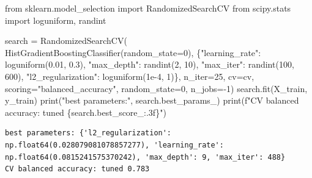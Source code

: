 \documentclass[
  letterpaper,
  DIV=11,
  numbers=noendperiod]{scrreprt}
\newenvironment{Shaded}{\begin{snugshade}}{\end{snugshade}}
\newcommand{\BuiltInTok}[1]{\textcolor[rgb]{0.00,0.23,0.31}{#1}}
\newcommand{\DecValTok}[1]{\textcolor[rgb]{0.68,0.00,0.00}{#1}}
\newcommand{\FloatTok}[1]{\textcolor[rgb]{0.68,0.00,0.00}{#1}}
\newcommand{\ImportTok}[1]{\textcolor[rgb]{0.00,0.46,0.62}{#1}}
\newcommand{\NormalTok}[1]{\textcolor[rgb]{0.00,0.23,0.31}{#1}}
\newcommand{\OperatorTok}[1]{\textcolor[rgb]{0.37,0.37,0.37}{#1}}
\newcommand{\SpecialCharTok}[1]{\textcolor[rgb]{0.37,0.37,0.37}{#1}}
\newcommand{\SpecialStringTok}[1]{\textcolor[rgb]{0.13,0.47,0.30}{#1}}
\newcommand{\StringTok}[1]{\textcolor[rgb]{0.13,0.47,0.30}{#1}}
\begin{document}
\begin{tcolorbox}[enhanced jigsaw, left=2mm, title=\textcolor{quarto-callout-caution-color}{\faFire}\hspace{0.5em}{Solution to Exercise 1}, opacityback=0, breakable, rightrule=.15mm, arc=.35mm, toptitle=1mm, colbacktitle=quarto-callout-caution-color!10!white, opacitybacktitle=0.6, coltitle=black, colframe=quarto-callout-caution-color-frame, bottomrule=.15mm, leftrule=.75mm, bottomtitle=1mm, titlerule=0mm, toprule=.15mm, colback=white]

\begin{Shaded}
\begin{Highlighting}[]
\ImportTok{from}\NormalTok{ sklearn.model\_selection }\ImportTok{import}\NormalTok{ RandomizedSearchCV}
\ImportTok{from}\NormalTok{ scipy.stats }\ImportTok{import}\NormalTok{ loguniform, randint}

\NormalTok{search }\OperatorTok{=}\NormalTok{ RandomizedSearchCV(}
\NormalTok{    HistGradientBoostingClassifier(random\_state}\OperatorTok{=}\DecValTok{0}\NormalTok{),}
\NormalTok{    \{}\StringTok{"learning\_rate"}\NormalTok{: loguniform(}\FloatTok{0.01}\NormalTok{, }\FloatTok{0.3}\NormalTok{), }\StringTok{"max\_depth"}\NormalTok{: randint(}\DecValTok{2}\NormalTok{, }\DecValTok{10}\NormalTok{),}
     \StringTok{"max\_iter"}\NormalTok{: randint(}\DecValTok{100}\NormalTok{, }\DecValTok{600}\NormalTok{), }\StringTok{"l2\_regularization"}\NormalTok{: loguniform(}\FloatTok{1e{-}4}\NormalTok{, }\DecValTok{1}\NormalTok{)\},}
\NormalTok{    n\_iter}\OperatorTok{=}\DecValTok{25}\NormalTok{, cv}\OperatorTok{=}\NormalTok{cv, scoring}\OperatorTok{=}\StringTok{"balanced\_accuracy"}\NormalTok{, random\_state}\OperatorTok{=}\DecValTok{0}\NormalTok{, n\_jobs}\OperatorTok{={-}}\DecValTok{1}\NormalTok{)}
\NormalTok{search.fit(X\_train, y\_train)}
\BuiltInTok{print}\NormalTok{(}\StringTok{"best parameters:"}\NormalTok{, search.best\_params\_)}
\BuiltInTok{print}\NormalTok{(}\SpecialStringTok{f"CV balanced accuracy: tuned }\SpecialCharTok{\{}\NormalTok{search}\SpecialCharTok{.}\NormalTok{best\_score\_}\SpecialCharTok{:.3f\}}\SpecialStringTok{"}\NormalTok{)}
\end{Highlighting}
\end{Shaded}

\begin{verbatim}
best parameters: {'l2_regularization': np.float64(0.028079081078857277), 'learning_rate': np.float64(0.0815241575370242), 'max_depth': 9, 'max_iter': 488}
CV balanced accuracy: tuned 0.783
\end{verbatim}


\end{tcolorbox}
\end{document}
